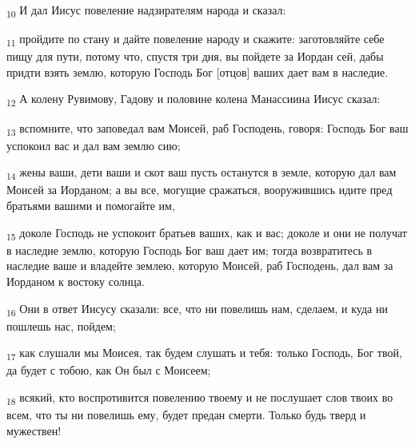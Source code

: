 \begin{tcolorbox}
\textsubscript{10} И дал Иисус повеление надзирателям народа и сказал:
\end{tcolorbox}
\begin{tcolorbox}
\textsubscript{11} пройдите по стану и дайте повеление народу и скажите: заготовляйте себе пищу для пути, потому что, спустя три дня, вы пойдете за Иордан сей, дабы придти взять землю, которую Господь Бог [отцов] ваших дает вам в наследие.
\end{tcolorbox}
\begin{tcolorbox}
\textsubscript{12} А колену Рувимову, Гадову и половине колена Манассиина Иисус сказал:
\end{tcolorbox}
\begin{tcolorbox}
\textsubscript{13} вспомните, что заповедал вам Моисей, раб Господень, говоря: Господь Бог ваш успокоил вас и дал вам землю сию;
\end{tcolorbox}
\begin{tcolorbox}
\textsubscript{14} жены ваши, дети ваши и скот ваш пусть останутся в земле, которую дал вам Моисей за Иорданом; а вы все, могущие сражаться, вооружившись идите пред братьями вашими и помогайте им,
\end{tcolorbox}
\begin{tcolorbox}
\textsubscript{15} доколе Господь не успокоит братьев ваших, как и вас; доколе и они не получат в наследие землю, которую Господь Бог ваш дает им; тогда возвратитесь в наследие ваше и владейте землею, которую Моисей, раб Господень, дал вам за Иорданом к востоку солнца.
\end{tcolorbox}
\begin{tcolorbox}
\textsubscript{16} Они в ответ Иисусу сказали: все, что ни повелишь нам, сделаем, и куда ни пошлешь нас, пойдем;
\end{tcolorbox}
\begin{tcolorbox}
\textsubscript{17} как слушали мы Моисея, так будем слушать и тебя: только Господь, Бог твой, да будет с тобою, как Он был с Моисеем;
\end{tcolorbox}
\begin{tcolorbox}
\textsubscript{18} всякий, кто воспротивится повелению твоему и не послушает слов твоих во всем, что ты ни повелишь ему, будет предан смерти. Только будь тверд и мужествен!
\end{tcolorbox}
